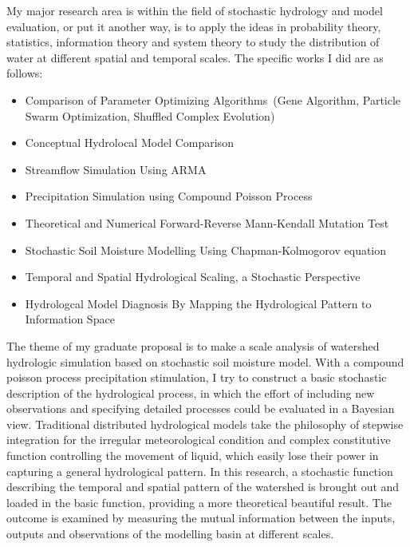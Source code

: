 \documentclass{res}
\begin{document}
\begin{resume}
My major research area is within the field of stochastic hydrology and model evaluation, or put it another way, is to apply the ideas in probability theory, statistics, information theory and system theory to study the distribution of water at different spatial and temporal scales.
The  specific works I did are as follows:
\begin{itemize}
\item Comparison of Parameter Optimizing Algorithms~(Gene Algorithm, Particle Swarm Optimization, Shuffled Complex Evolution)
\item Conceptual Hydrolocal Model Comparison
\item Streamflow Simulation Using ARMA
\item Precipitation Simulation using Compound Poisson Process 
\item Theoretical and Numerical Forward-Reverse Mann-Kendall Mutation Test
\item Stochastic Soil Moisture Modelling Using Chapman-Kolmogorov equation
\item Temporal and Spatial Hydrological Scaling, a Stochastic Perspective 
\item Hydrologcal Model Diagnosis By Mapping the Hydrological Pattern to Information Space
\end{itemize}          
The theme of my graduate proposal is to make a scale analysis of watershed hydrologic simulation based on stochastic soil moisture model. With a compound poisson process precipitation stimulation, I try to construct a basic stochastic description of the hydrological process, in which the effort of including new observations and specifying detailed processes could be evaluated in a Bayesian view. Traditional distributed hydrological models take the philosophy of stepwise integration for the irregular meteorological condition and complex constitutive function controlling the movement of liquid, which easily lose their power in capturing a general hydrological pattern. In this research, a stochastic function describing the temporal and spatial pattern of the watershed is brought out and loaded in the basic function, providing a more theoretical beautiful 
result. The outcome is examined by measuring the mutual information between the inputs, outputs and observations of the modelling basin at different scales.         
  

\end{resume}
\end{document}
